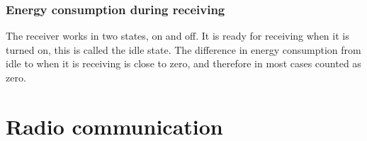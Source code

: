 \subsubsection*{Energy consumption during receiving}
The receiver works in two states, on and off. It is ready for receiving when it is turned on, this is called the idle state. The difference in energy consumption from idle to when it is receiving is close to zero, and therefore in most cases counted as zero.
  
 
\section{Radio communication}